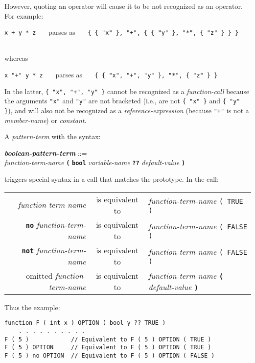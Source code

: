 \documentclass[12pt]{article}
\newcommand{\TT}[1]{{\tt \bfseries #1}}
\newcommand{\emkey}[1]{{\em \bfseries #1}}
\newenvironment{indpar}[1][0.3in]%
	{\begin{list}{}%
		     {\setlength{\itemsep}{0in}%
		      \setlength{\topsep}{0in}%
		      \setlength{\parsep}{1ex}%
		      \setlength{\labelwidth}{#1}%
		      \setlength{\leftmargin}{#1}%
		      \addtolength{\leftmargin}{\labelsep}}%
	 \item}%
	{\end{list}}
\begin{document}
However, quoting an operator will cause it to be not recognized as
an operator.  For example:
\\[0.5ex]
\centerline{
{\tt x + y * z}
~~~parses as~~~
{\tt \{ \{ "x" \}, "+", \{ \{ "y" \}, "*", \{ "z" \} \} \}} \\
} \\
whereas \\
\centerline{
{\tt x "+" y * z}
~~~parses as~~~
{\tt \{ \{ "x", "+", "y" \}, "*", \{ "z" \} \}}
}
In the latter, {\tt \{ "x", "+", "y" \}} cannot be recognized as
a {\em function-call} because the arguments {\tt "x"} and {\tt "y"} are
not bracketed (i.e., are not {\tt \{ "x" \}} and {\tt \{ "y" \}}),
and will also not be recognized as a {\em reference-expression}
(because {\tt "+"} is not a {\em member-name}) or
{\em constant}.

A {\em pattern-term} with the syntax:
\begin{indpar}
\emkey{boolean-pattern-term}\label{BOOLEAN-PATTERN-TERM} ::= \\
\hspace*{1in} {\em function-term-name} \TT{(}
        \TT{bool} {\em variable-name}
	\TT{??} {\em default-value} \TT{)}
\end{indpar}

triggers special syntax in a call that matches the prototype.
In the call:
\begin{center}
\begin{tabular}{rcl}
{\em function-term-name} & is equivalent to
                         & {\em function-term-name} \tt ( TRUE ) \\
\TT{no} {\em function-term-name} & is equivalent to
                         & {\em function-term-name} \tt ( FALSE ) \\
\TT{not} {\em function-term-name} & is equivalent to
                         & {\em function-term-name} \tt ( FALSE ) \\
omitted {\em function-term-name} & is equivalent to
                         & {\em function-term-name}
			   \TT{(} {\em default-value} \TT{)} \\
\end{tabular}
\end{center}
Thus the example:
\begin{indpar}\begin{verbatim}
function F ( int x ) OPTION ( bool y ?? TRUE )
    . . . . . . . . . .
F ( 5 )            // Equivalent to F ( 5 ) OPTION ( TRUE )
F ( 5 ) OPTION     // Equivalent to F ( 5 ) OPTION ( TRUE )
F ( 5 ) no OPTION  // Equivalent to F ( 5 ) OPTION ( FALSE )
\end{verbatim}\end{indpar}
\end{document}
